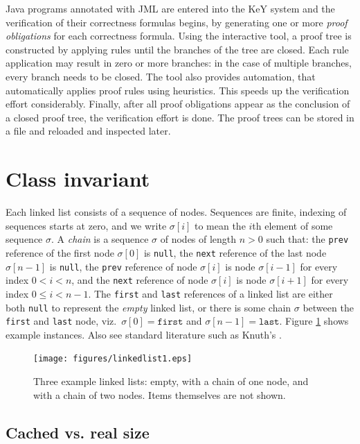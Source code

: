 \documentclass[runningheads]{llncs}
\begin{document}
Java programs annotated with JML are entered into the KeY system and the verification of their correctness formulas begins, by generating one or more \emph{proof obligations} for each correctness formula. Using the interactive tool, a proof tree is constructed by applying rules until the branches of the tree are closed. Each rule application may result in zero or more branches: in the case of multiple branches, every branch needs to be closed. The tool also provides automation, that automatically applies proof rules using heuristics. This speeds up the verification effort considerably. Finally, after all proof obligations appear as the conclusion of a closed proof tree, the verification effort is done. The proof trees can be stored in a file and reloaded and inspected later.

\section{Class invariant}\label{sec:class-invariant}

Each linked list consists of a sequence of nodes. Sequences are finite, indexing of sequences starts at zero, and we write $\sigma[i]$ to mean the $i$th element of some sequence $\sigma$. A \emph{chain} is a sequence $\sigma$ of nodes of length $n>0$ such that: the \texttt{prev} reference of the first node $\sigma[0]$ is \texttt{null}, the \texttt{next} reference of the last node $\sigma[n-1]$ is \texttt{null}, the \texttt{prev} reference of node $\sigma[i]$ is node $\sigma[i-1]$ for every index $0<i<n$, and the \texttt{next} reference of node $\sigma[i]$ is node $\sigma[i+1]$ for every index $0\leq i < n-1$. The \texttt{first} and \texttt{last} references of a linked list are either both \texttt{null} to represent the \emph{empty} linked list, or there is some chain $\sigma$ between the \texttt{first} and \texttt{last} node, viz.~$\sigma[0]=\mathtt{first}$ and $\sigma[n-1]=\mathtt{last}$. Figure \ref{fig:linkedlist} shows example instances.
Also see standard literature such as Knuth's \cite[Section 2.2.5]{knuth1997art}.

\begin{figure}[t]
  \centering
  \texttt{[image: figures/linkedlist1.eps]}
  \caption{Three example linked lists: empty, with a chain of one node, and with a chain of two nodes. Items themselves are not shown.}
  \label{fig:linkedlist}
\end{figure}

\subsection{Cached vs. real size}
\end{document}
